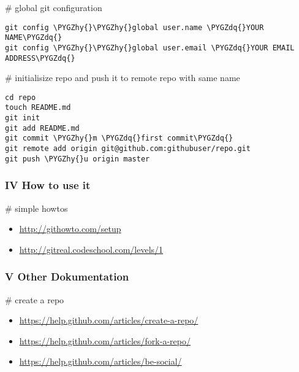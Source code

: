 \documentclass[letterpaper,10pt,english]{sphinxmanual}
\def\PYGZhy{\char`\-}
\def\PYGZdq{\char`\"}
\begin{document}
\# global git configuration

\begin{Verbatim}[commandchars=\\\{\}]
git config \PYGZhy{}\PYGZhy{}global user.name \PYGZdq{}YOUR NAME\PYGZdq{}
git config \PYGZhy{}\PYGZhy{}global user.email \PYGZdq{}YOUR EMAIL ADDRESS\PYGZdq{}
\end{Verbatim}

\# initialisize repo and push it to remote repo with same name

\begin{Verbatim}[commandchars=\\\{\}]
cd repo
touch README.md
git init
git add README.md
git commit \PYGZhy{}m \PYGZdq{}first commit\PYGZdq{}
git remote add origin git@github.com:githubuser/repo.git
git push \PYGZhy{}u origin master
\end{Verbatim}


\subsubsection{IV How to use it}
\label{sdocs/github/github:iv-how-to-use-it}
\# simple howtos
\begin{itemize}
\item {} 
\href{http://githowto.com/setup}{http://githowto.com/setup}

\item {} 
\href{http://gitreal.codeschool.com/levels/1}{http://gitreal.codeschool.com/levels/1}

\end{itemize}


\subsubsection{V Other Dokumentation}
\label{sdocs/github/github:v-other-dokumentation}
\# create a repo
\begin{itemize}
\item {} 
\href{https://help.github.com/articles/create-a-repo/}{https://help.github.com/articles/create-a-repo/}

\item {} 
\href{https://help.github.com/articles/fork-a-repo/}{https://help.github.com/articles/fork-a-repo/}

\item {} 
\href{https://help.github.com/articles/be-social/}{https://help.github.com/articles/be-social/}

\end{itemize}
\end{document}
